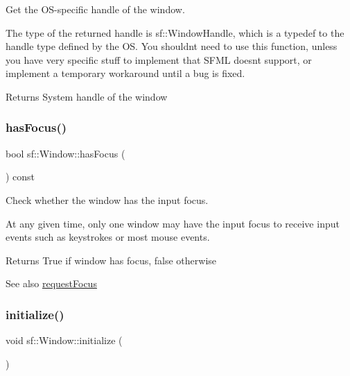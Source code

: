 Get the O\+S-\/specific handle of the window. 

The type of the returned handle is sf\+::\+Window\+Handle, which is a typedef to the handle type defined by the OS. You shouldn\textquotesingle{}t need to use this function, unless you have very specific stuff to implement that S\+F\+ML doesn\textquotesingle{}t support, or implement a temporary workaround until a bug is fixed.

\begin{DoxyReturn}{Returns}
System handle of the window \begin{DoxyVerb}\end{DoxyVerb}
 
\end{DoxyReturn}
\mbox{\label{classsf_1_1_window_ad8db2e6500d13ca9396281296404ba31}} 
\subsubsection{\texorpdfstring{hasFocus()}{hasFocus()}}
{\footnotesize\ttfamily bool sf\+::\+Window\+::has\+Focus (\begin{DoxyParamCaption}{ }\end{DoxyParamCaption}) const}



Check whether the window has the input focus. 

At any given time, only one window may have the input focus to receive input events such as keystrokes or most mouse events.

\begin{DoxyReturn}{Returns}
True if window has focus, false otherwise 
\end{DoxyReturn}
\begin{DoxySeeAlso}{See also}
\mbox{\hyperlink{classsf_1_1_window_a58cf7fa1775e8e7542032e3ecfa83b49}{request\+Focus}} \begin{DoxyVerb}\end{DoxyVerb}
 
\end{DoxySeeAlso}
\mbox{\label{classsf_1_1_window_a75a8263a54f73f71572ce69f0f0cbbca}} 
\subsubsection{\texorpdfstring{initialize()}{initialize()}}
{\footnotesize\ttfamily void sf\+::\+Window\+::initialize (\begin{DoxyParamCaption}{ }\end{DoxyParamCaption})\hspace{0.3cm}{\ttfamily [private]}}



